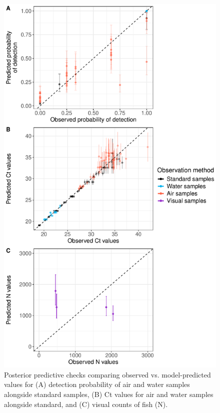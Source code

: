 \documentclass{article}
\begin{document}
\clearpage
\begin{figure}[tbhp] 
\centering
\includegraphics[width=12.0cm]{../../Plots/Supplementary Figure 5.pdf}  
\caption{Posterior predictive checks comparing observed vs. model-predicted values for (A) detection probability of air and water samples alongside standard samples, (B) Ct values for air and water samples alongside standard, and (C) visual counts of fish (N).}
\label{fig:postpred}
\end{figure}

\end{document}
